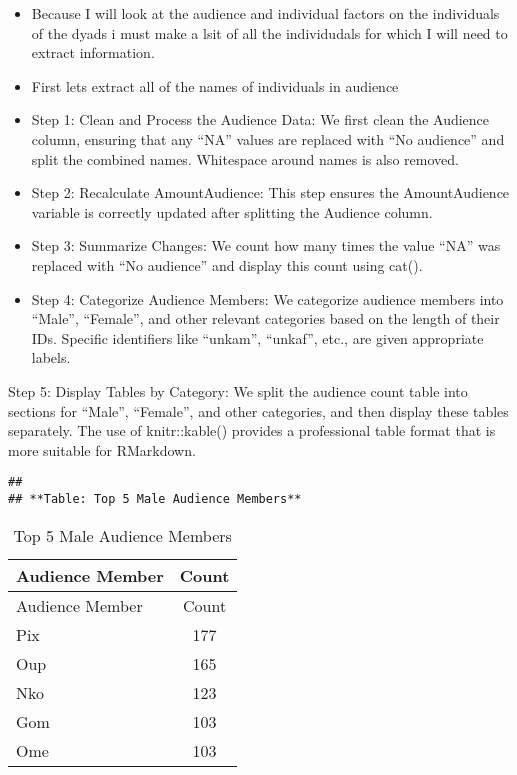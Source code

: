 \documentclass[
]{article}
\begin{document}
\begin{itemize}
\item
  Because I will look at the audience and individual factors on the
  individuals of the dyads i must make a lsit of all the individudals
  for which I will need to extract information.
\item
  First lets extract all of the names of individuals in audience
\item
  Step 1: Clean and Process the Audience Data: We first clean the
  Audience column, ensuring that any ``NA'' values are replaced with
  ``No audience'' and split the combined names. Whitespace around names
  is also removed.
\item
  Step 2: Recalculate AmountAudience: This step ensures the
  AmountAudience variable is correctly updated after splitting the
  Audience column.
\item
  Step 3: Summarize Changes: We count how many times the value ``NA''
  was replaced with ``No audience'' and display this count using cat().
\item
  Step 4: Categorize Audience Members: We categorize audience members
  into ``Male'', ``Female'', and other relevant categories based on the
  length of their IDs. Specific identifiers like ``unkam'', ``unkaf'',
  etc., are given appropriate labels.
\end{itemize}

Step 5: Display Tables by Category: We split the audience count table
into sections for ``Male'', ``Female'', and other categories, and then
display these tables separately. The use of knitr::kable() provides a
professional table format that is more suitable for RMarkdown.

\begin{verbatim}
## 
## **Table: Top 5 Male Audience Members**
\end{verbatim}

\begin{longtable}[]{@{}lc@{}}
\caption{Top 5 Male Audience Members}\tabularnewline
\toprule
Audience Member & Count \\
\midrule
\endfirsthead
\toprule
Audience Member & Count \\
\midrule
\endhead
Pix & 177 \\
Oup & 165 \\
Nko & 123 \\
Gom & 103 \\
Ome & 103 \\
\bottomrule
\end{longtable}
\end{document}
